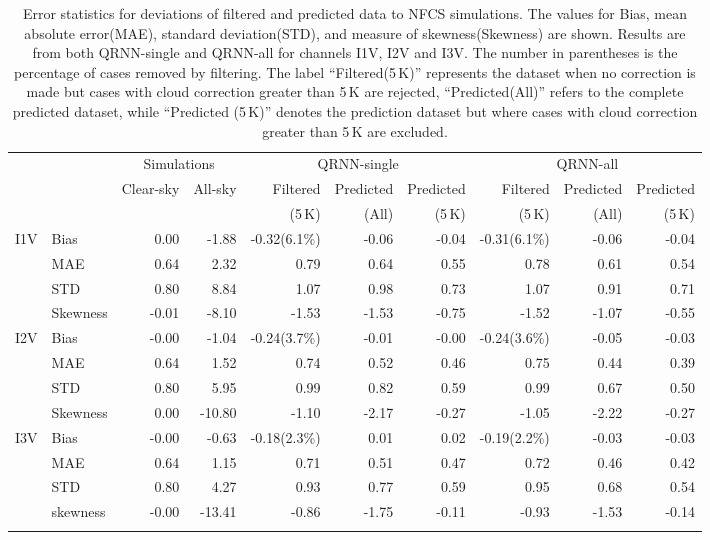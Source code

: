 \documentclass[amt, manuscript]{copernicus}
\begin{document}
\begin{table}[t]
	\caption{ Error statistics for deviations of filtered and predicted data to NFCS simulations. 
		The values for Bias, mean absolute error(MAE), standard deviation(STD), and measure of skewness(Skewness) are shown. Results are from both QRNN-single and QRNN-all for channels I1V, I2V and I3V. The number in parentheses is the percentage of cases removed by filtering. The label ``Filtered(5\,K)'' represents the dataset when no correction is made but cases with cloud correction greater than 5\,K are rejected, ``Predicted(All)'' refers to the complete predicted dataset, while ``Predicted (5\,K)'' denotes the prediction dataset but where cases with cloud correction greater than 5\,K are excluded.}
	\label{tab:error_statistics_ici}
	\begin{tabular}{llrr|rrr|rrr}
		\tophline
		&&\multicolumn{2}{c|}{Simulations}& \multicolumn{3}{c|}{QRNN-single} & \multicolumn{3}{c}{QRNN-all}\\
		\cline{3-10}
		&&   Clear-sky &   All-sky &  Filtered & Predicted & Predicted &   Filtered & Predicted & Predicted \\
		&&&&							(5\,K) &(All)& (5\,K) & (5\,K)&(All)& (5\,K)\\
		\middlehline
		
		I1V& Bias     &  0.00 & -1.88 & -0.32(6.1\%) & -0.06 & -0.04 & -0.31(6.1\%) & -0.06 & -0.04 \\
		&MAE      &  0.64 &  2.32 &  0.79 &  0.64 &  0.55 &  0.78 &  0.61 &  0.54 \\
		&STD      &  0.80 &  8.84 &  1.07 &  0.98 &  0.73 &  1.07 &  0.91 &  0.71 \\
		&Skewness & -0.01 & -8.10 & -1.53 & -1.53 & -0.75 & -1.52 & -1.07 & -0.55 \\
		\middlehline
		I2V &Bias     & -0.00 &  -1.04 & -0.24(3.7\%) & -0.01 & -0.00 & -0.24(3.6\%) & -0.05 & -0.03 \\
		&MAE      &  0.64 &   1.52 &  0.74 &  0.52 &  0.46 &  0.75 &  0.44 &  0.39 \\
		&STD      &  0.80 &   5.95 &  0.99 &  0.82 &  0.59 &  0.99 &  0.67 &  0.50 \\
		&Skewness &  0.00 & -10.80 & -1.10 & -2.17 & -0.27 & -1.05 & -2.22 & -0.27 \\
		\middlehline	
		I3V &Bias     & -0.00 &  -0.63 & -0.18(2.3\%) &  0.01 &  0.02 & -0.19(2.2\%) & -0.03 & -0.03 \\
		&MAE      &  0.64 &   1.15 &  0.71 &  0.51 &  0.47 &  0.72 &  0.46 &  0.42 \\
		&STD      &  0.80 &   4.27 &  0.93 &  0.77 &  0.59 &  0.95 &  0.68 &  0.54 \\
		&skewness & -0.00 & -13.41 & -0.86 & -1.75 & -0.11 & -0.93 & -1.53 & -0.14 \\
		\bottomhline
	\end{tabular}
	\belowtable{} %
\end{table}
\end{document}
